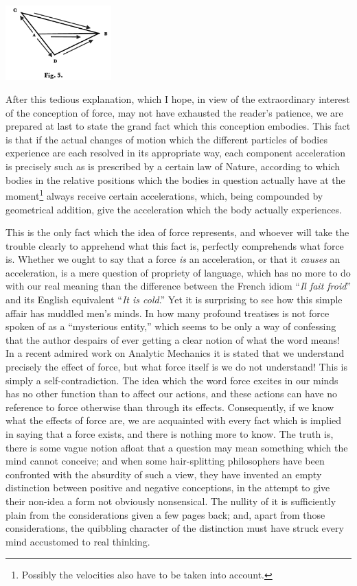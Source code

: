 \documentclass[]{article}
\newcounter{authornote}[page]
\newcommand{\authornote}[1]{\renewcommand{\thefootnote}{\fnsymbol{footnote}}\stepcounter{authornote}\footnote[\value{authornote}]{#1}\renewcommand{\thefootnote}{\arabic{footnote}}}
\begin{document}
\centerline{\includegraphics[width=1.6in]{peirce-howto3.pdf}}

After this tedious explanation, which I hope, in view of the extraordinary interest of the conception of force, may not have exhausted the reader's patience, we are prepared at last to state the grand fact which this conception embodies. This fact is that if the actual changes of motion which the different particles of bodies experience are each resolved in its appropriate way, each component acceleration is precisely such as is prescribed by a certain law of Nature, according to which bodies in the relative positions which the bodies in question actually have at the moment\authornote{Possibly the velocities also have to be taken into account.} always receive certain accelerations, which, being compounded by geometrical addition, give the acceleration which the body actually experiences.


This is the only fact which the idea of force represents, and whoever will take the trouble clearly to apprehend what this fact is, perfectly comprehends what force is. Whether we ought to say that a force \emph{is} an acceleration, or that it \emph{causes} an acceleration, is a mere question of propriety of language, which has no more to do with our real meaning than the difference between the French idiom ``\emph{Il fait froid}'' and its English equivalent ``\emph{It is cold}.'' Yet it is surprising to see how this simple affair has muddled men's minds. In how many profound treatises is not force spoken of as a ``mysterious entity,'' which seems to be only a way of confessing that the author despairs of ever getting a clear notion of what the word means! In a recent admired work on Analytic Mechanics it is stated that we understand precisely the effect of force, but what force itself is we do not understand! This is simply a self-contradiction. The idea which the word force excites in our minds has no other function than to affect our actions, and these actions can have no reference to force otherwise than through its effects. Consequently, if we know what the effects of force are, we are acquainted with every fact which is implied in saying that a force exists, and there is nothing more to know. The truth is, there is some vague notion afloat that a question may  mean something which the mind cannot conceive; and when some hair-splitting philosophers have been confronted with the absurdity of such a view, they have invented an empty distinction between positive and negative conceptions, in the attempt to give their non-idea a form not obviously nonsensical. The nullity of it is sufficiently plain from the considerations given a few pages back; and, apart from those considerations, the quibbling character of the distinction must have struck every mind accustomed to real thinking.
\end{document}
